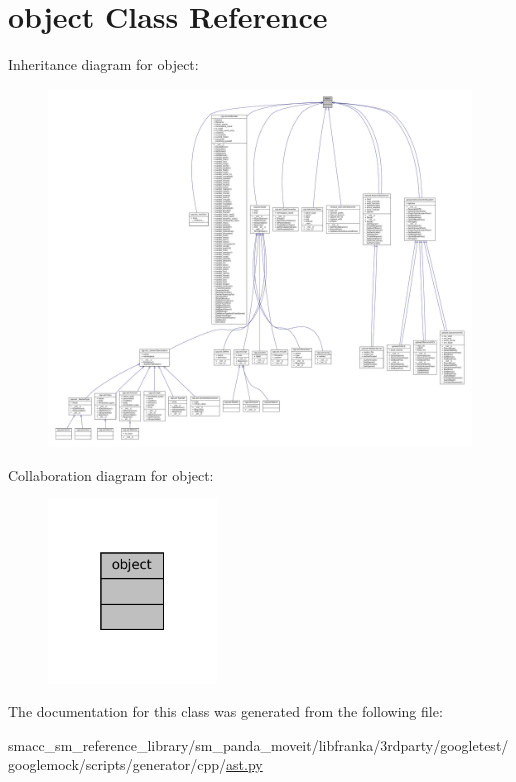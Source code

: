 \hypertarget{classobject}{}\section{object Class Reference}
\label{classobject}


Inheritance diagram for object\+:
\nopagebreak
\begin{figure}[H]
\begin{center}
\leavevmode
\includegraphics[width=350pt]{classobject__inherit__graph}
\end{center}
\end{figure}


Collaboration diagram for object\+:
\nopagebreak
\begin{figure}[H]
\begin{center}
\leavevmode
\includegraphics[width=127pt]{classobject__coll__graph}
\end{center}
\end{figure}


The documentation for this class was generated from the following file\+:\begin{DoxyCompactItemize}
\item 
smacc\+\_\+sm\+\_\+reference\+\_\+library/sm\+\_\+panda\+\_\+moveit/libfranka/3rdparty/googletest/googlemock/scripts/generator/cpp/\hyperlink{ast_8py}{ast.\+py}\end{DoxyCompactItemize}
